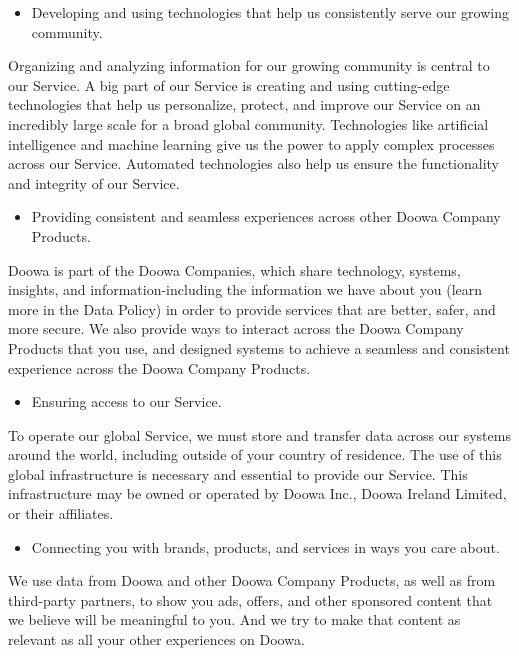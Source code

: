 \documentclass[conference]{IEEEtran}
\begin{document}
\begin{itemize}
\item Developing and using technologies that help us consistently serve our growing community.
\end{itemize}

Organizing and analyzing information for our growing community is central to our Service. A big part of our Service is creating and using cutting-edge technologies that help us personalize, protect, and improve our Service on an incredibly large scale for a broad global community. Technologies like artificial intelligence and machine learning give us the power to apply complex processes across our Service. Automated technologies also help us ensure the functionality and integrity of our Service.

\begin{itemize}
\item Providing consistent and seamless experiences across other Doowa Company Products.
\end{itemize}

Doowa is part of the Doowa Companies, which share technology, systems, insights, and information-including the information we have about you (learn more in the Data Policy) in order to provide services that are better, safer, and more secure. We also provide ways to interact across the Doowa Company Products that you use, and designed systems to achieve a seamless and consistent experience across the Doowa Company Products.

\begin{itemize}
\item Ensuring access to our Service.
\end{itemize}

To operate our global Service, we must store and transfer data across our systems around the world, including outside of your country of residence. The use of this global infrastructure is necessary and essential to provide our Service. This infrastructure may be owned or operated by Doowa Inc., Doowa Ireland Limited, or their affiliates.

\begin{itemize}
\item Connecting you with brands, products, and services in ways you care about.
\end{itemize}

We use data from Doowa and other Doowa Company Products, as well as from third-party partners, to show you ads, offers, and other sponsored content that we believe will be meaningful to you. And we try to make that content as relevant as all your other experiences on Doowa.
\end{document}
